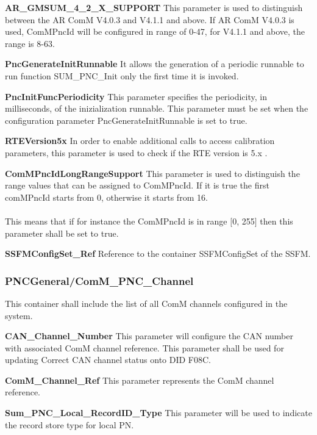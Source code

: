 \textbf{AR\_GMSUM\_4\_2\_X\_SUPPORT }\newline
This parameter is used to distinguish between the AR ComM V4.0.3 and V4.1.1 and above. If AR ComM V4.0.3 is used, ComMPncId will be configured in range of 0-47, for V4.1.1 and above, the range is 8-63. 

\textbf{PncGenerateInitRunnable}\newline
It allows the generation of a periodic runnable to run function SUM\_PNC\_Init only the first time it is invoked.

\textbf{PncInitFuncPeriodicity}\newline
This parameter specifies the periodicity, in milliseconds, of the inizialization runnable. This parameter must be set when the configuration parameter PncGenerateInitRunnable is set to true.

\textbf{RTEVersion5x}\newline
In order to enable additional calls to access calibration parameters, this parameter is used to check if the RTE version is 5.x .

\textbf{ComMPncIdLongRangeSupport}\newline
This parameter is used to distinguish the range values that can be assigned to ComMPncId. If it is true the first comMPncId starts from 0, otherwise it starts from 16.
\\
\\
This means that if for instance the ComMPncId is in range $[$0, 255$]$ then this parameter shall be set to true.

\textbf{SSFMConfigSet\_Ref}\newline
Reference to the container SSFMConfigSet of the SSFM.

\subsubsection{PNCGeneral/ComM\_PNC\_Channel}
This container shall include the list of all ComM channels configured in the system.

\textbf{CAN\_Channel\_Number}\newline
This parameter will configure the CAN number with associated ComM channel reference. This parameter shall be used for updating Correct CAN channel status onto DID F08C.

\textbf{ComM\_Channel\_Ref}\newline
This parameter represents the ComM channel reference.

\textbf{Sum\_PNC\_Local\_RecordID\_Type}\newline 
This parameter will be used to indicate the record store type for local PN.

